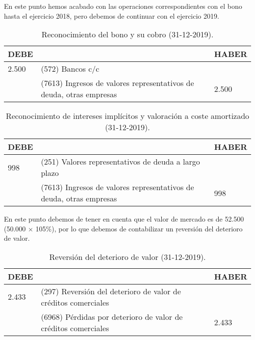 En este punto hemos acabado con las operaciones correspondientes con el bono hasta el ejercicio 2018, pero debemos de continuar con el ejercicio 2019.

\begin{table}[H]
    \centering
    \begin{tabular}{|p{2cm}|p{6cm}|p{2cm}|}
    \hline
    \rowcolor{blue!30}
    \textbf{DEBE} & \textbf{} & \textbf{HABER} \\
    \hline
    2.500 & (572) Bancos c/c & \\
    \hline
    & (7613) Ingresos de valores representativos de deuda, otras empresas \newline&2.500 \\
    \hline
    \end{tabular}
    \caption{Reconocimiento del bono y su cobro (31-12-2019).}
    \label{tabla:reconocimiento_bono}
\end{table}

\begin{table}[H]
    \centering
    \begin{tabular}{|p{2cm}|p{6cm}|p{2cm}|}
    \hline
    \rowcolor{blue!30}
    \textbf{DEBE} & \textbf{} & \textbf{HABER} \\
    \hline
    998 & (251) Valores representativos de deuda a largo plazo & \\
    \hline
    & (7613) Ingresos de valores representativos de deuda, otras empresas& 998 \\
    \hline
    \end{tabular}
    \caption{Reconocimiento de intereses implícitos y valoración a coste amortizado (31-12-2019).}
    \label{tabla:intereses_implicitos}
\end{table}

En este punto debemos de tener en cuenta que el valor de mercado es de 52.500 \e (50.000 $\times$ 105\%), por lo que debemos de contabilizar un \c{reversión del deterioro de valor}.

\begin{table}[H]
    \centering
    \begin{tabular}{|p{2cm}|p{6cm}|p{2cm}|}
    \hline
    \rowcolor{blue!30}
    \textbf{DEBE} & \textbf{} & \textbf{HABER} \\
    \hline
    2.433 & (297) Reversión del deterioro de valor de créditos comerciales & \\
    \hline
    & (6968) Pérdidas por deterioro de valor de créditos comerciales & 2.433 \\
    \hline
    \end{tabular}
    \caption{Reversión del deterioro de valor (31-12-2019).}
    \label{tabla:reversion_deterioro}
\end{table}


